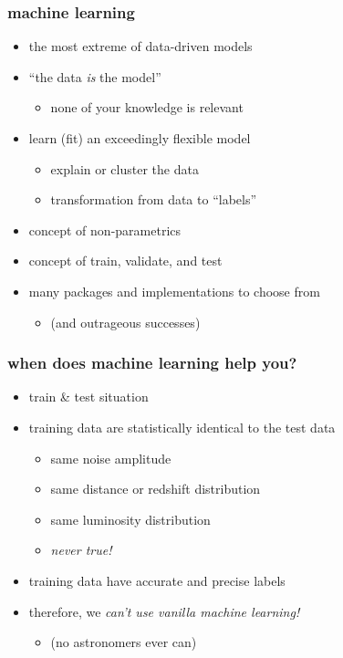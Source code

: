 \documentclass[pdftex]{beamer}
\begin{document}
\begin{frame}
  \frametitle{machine learning}
  \begin{itemize}
  \item the most extreme of data-driven models
  \item ``the data \emph{is} the model''
    \begin{itemize}
    \item none of your knowledge is relevant
    \end{itemize}
  \item learn (fit) an exceedingly flexible model
    \begin{itemize}
    \item explain or cluster the data
    \item transformation from data to ``labels''
    \end{itemize}
  \item concept of non-parametrics
  \item concept of train, validate, and test
  \item many packages and implementations to choose from
    \begin{itemize}
    \item (and outrageous successes)
    \end{itemize}
  \end{itemize}
\end{frame}

\begin{frame}
  \frametitle{when does machine learning help you?}
  \begin{itemize}
  \item train \& test situation
  \item training data are statistically identical to the test data
    \begin{itemize}
    \item same noise amplitude
    \item same distance or redshift distribution
    \item same luminosity distribution
    \item \emph{never true!}
    \end{itemize}
  \item training data have accurate and precise labels
  \item therefore, we \emph{can't use vanilla machine learning!}
    \begin{itemize}
    \item (no astronomers ever can)
    \end{itemize}
  \end{itemize}
\end{frame}
\end{document}
